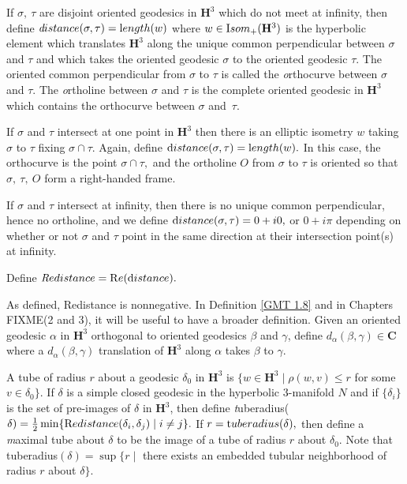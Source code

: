 \begin{definition}
  If $\sigma,\ \tau$ are disjoint oriented geodesics  in 
${\mathbf H}^3$ which do not meet at infinity,
then define
${\textit distance}(\sigma,\tau)={\textrm length}(w)$ where 
$w\in {\textrm Isom}_+({\mathbf H}^3)$ is the hyperbolic
element which translates ${\mathbf H}^3$
along the unique common perpendicular between $\sigma$ and $\tau$ and which takes the
oriented geodesic $\sigma$ to the
oriented geodesic $\tau$.  The oriented common perpendicular from $\sigma$ to $\tau$ is
called the {\textit orthocurve} between $\sigma$
and $\tau$.  The {\textit ortholine} between $\sigma$ and $\tau$ is the complete oriented
geodesic in ${\mathbf H}^3$ which contains the
orthocurve between $\sigma$ and~$\tau$.

If $\sigma$ and $\tau$ intersect at one point in ${\mathbf H}^3$ then 
there is an elliptic isometry $w$ taking $\sigma$ to $\tau$ fixing $\sigma \cap \tau.$  Again,  define ${\textrm distance}(\sigma, \tau) = {\textrm length}(w).$  In this case, the orthocurve is the point $\sigma \cap \tau,$ and the ortholine $O$ from $\sigma$ to $\tau$ is oriented
so that $\sigma,\ \tau,\ O$ form a right-handed frame.

If $\sigma$ and $\tau$ intersect at infinity, then there is no unique common perpendicular, hence no ortholine, and we define
${\textrm distance}(\sigma,\tau) = 0 + i0,$ or $0 + i\pi$ depending on whether or not $\sigma$ and $\tau$ point in the same direction at their intersection point(s) at infinity.

Define ${\textit Redistance} = {\mathrm Re} ({\textrm distance}).$

As defined, Redistance is nonnegative.
In Definition \ref{GMT 1.8} and in Chapters FIXME(2 and 3),
it will be useful to have a broader definition. Given an oriented
geodesic $\alpha$ in ${\mathbf H}^3$ orthogonal to oriented geodesics $\beta$ and $\gamma$, define $d_\alpha(\beta,\gamma) \in {\mathbf C}$ where a
$d_\alpha(\beta,\gamma)$ translation of ${\mathbf H}^3$  along $\alpha$ takes $\beta$ to $\gamma.$
\end{definition}

\begin{definition}
A tube of radius $r$ about a geodesic $\delta_0$ in ${\mathbf H}^3$ is 
$\{w \in {\mathbf H}^3 \mid \rho(w, v) \le r$ for some $v \in \delta_0 \}.$    
If $\delta$
is a simple closed geodesic in the hyperbolic $3$-manifold $N$ and if
$\{\delta_i \}$ is the set of pre-images of $\delta$ in ${\mathbf H}^3$, then define
{\textit tuberadius}($\delta)={1 \over 2} \min 
\{{\textrm Redistance}(\delta_i,\delta_j) \mid i\neq j \}.$
If $r = {\textrm tuberadius}(\delta),$ 
then define a {\textit maximal tube} about $\delta$ to be the
image of a tube of radius $r$ about $\delta_0.$  Note that
tuberadius$(\delta)=
\sup\{r \mid $ there exists an embedded tubular neighborhood of
radius $r$ about $\delta \}.$
\end{definition}

